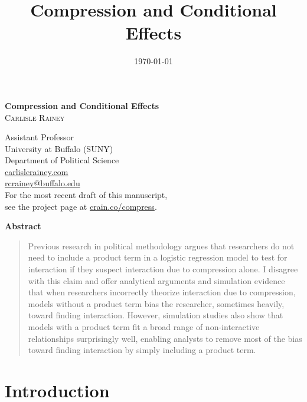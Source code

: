 \documentclass[12pt]{article}
\title{Compression and Conditional Effects}
\date{\today}
\begin{document}
\begin{center}
\LARGE{\textbf{Compression and Conditional Effects}}\\\vspace{4mm}
\normalsize{\textsc{Carlisle Rainey}}\\\vspace{2mm}
\begin{small}\singlespace
Assistant Professor\\
University at Buffalo (SUNY)\\
Department of Political Science\\
\href{http://www.carlislerainey.com}{carlislerainey.com}\\
\href{mailto:rcrainey@buffalo.edu}{rcrainey@buffalo.edu}\\\vspace{4mm}
For the most recent draft of this manuscript,\\see the project page at \href{http://www.carlislerainey.com/research/compression-and-conditional-effects/}{crain.co/compress}.
\end{small}
\end{center}

\thispagestyle{empty}
{\centerline{\textbf{Abstract}}}
\begin{quote}\noindent Previous research in political methodology argues that researchers do not need to include a product term in a logistic regression model to test for interaction if they suspect interaction due to compression alone. I disagree with this claim and offer analytical arguments and simulation evidence that when researchers incorrectly theorize interaction due to compression, models without a product term bias the researcher, sometimes heavily, toward finding interaction. However, simulation studies also show that models with a product term fit a broad range of non-interactive relationships surprisingly well, enabling analysts to remove most of the bias toward finding interaction by simply including a product term.\end{quote}
\thispagestyle{empty}
\singlespace
\setcounter{page}{1}

\doublespace


\section*{Introduction}
\end{document}
